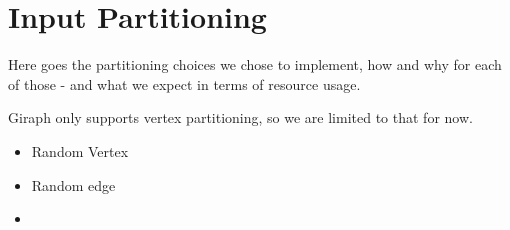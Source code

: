 \section{Input Partitioning}
\label{sec:partitioning}

Here goes the partitioning choices we chose to implement, how and why for 
each of those - and what we expect in terms of resource usage.

Giraph only supports vertex partitioning, so we are limited to that for now.

\begin{itemize}
    \item Random Vertex
    \item Random edge
    \item 
\end{itemize}